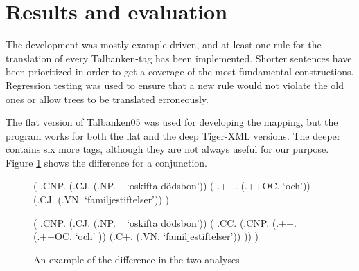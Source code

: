 \documentclass{report}
\begin{document}
%

\section{Results and evaluation}
The development was mostly example-driven, and at least one rule for the translation of
every Talbanken-tag has been implemented.
Shorter sentences have been prioritized in order to get a coverage of the most
fundamental constructions. 
Regression testing was used to ensure that a new rule would not violate the old ones
or allow trees to be translated erroneously.


The flat version of Talbanken05 was used for developing the mapping, but
the program works for both the flat and the deep Tiger-XML versions.
The deeper contains six more tags, although they are not always useful for our       
purpose. Figure \ref{fig:mappDeepFlat} shows the difference for a conjunction.
\begin{figure}[h]
\begin{parsetree}
    ( .CNP. 
        (.CJ.  (.NP. ~ `oskifta dödsbon'))
        ( .++. (.++OC. `och'))
        (.CJ.  (.VN. `familjestiftelser'))
    )
\end{parsetree}
\begin{parsetree}
    ( .CNP. 
        (.CJ.  (.NP. ~ `oskifta dödsbon'))
        ( .CC.
            (.CNP. 
                (.++.  (.++OC. `och' ))
                (.C+.  (.VN. `familjestiftelser'))
         ))
    )
\end{parsetree}
\caption{An example of the difference in the two analyses}
\label{fig:mappDeepFlat}
\end{figure}
\end{document}

